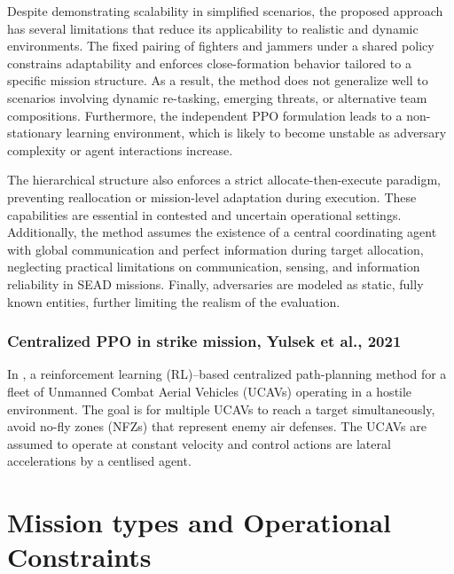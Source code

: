 Despite demonstrating scalability in simplified scenarios, the proposed approach has several limitations that reduce its applicability to realistic and dynamic environments. The fixed pairing of fighters and jammers under a shared policy constrains adaptability and enforces close-formation behavior tailored to a specific mission structure. As a result, the method does not generalize well to scenarios involving dynamic re-tasking, emerging threats, or alternative team compositions. Furthermore, the independent PPO formulation leads to a non-stationary learning environment, which is likely to become unstable as adversary complexity or agent interactions increase.

The hierarchical structure also enforces a strict allocate-then-execute paradigm, preventing reallocation or mission-level adaptation during execution. These capabilities are essential in contested and uncertain operational settings. Additionally, the method assumes the existence of a central coordinating agent with global communication and perfect information during target allocation, neglecting practical limitations on communication, sensing, and information reliability in SEAD missions. Finally, adversaries are modeled as static, fully known entities, further limiting the realism of the evaluation.

\subsubsection{Centralized PPO in strike mission, Yulsek et al., 2021}
In \cite{yuksek2021cooperative}, a reinforcement learning (RL)–based centralized path-planning method for a fleet of Unmanned Combat Aerial Vehicles (UCAVs) operating in a hostile environment. The goal is for multiple UCAVs to reach a target simultaneously, avoid no-fly zones (NFZs) that represent enemy air defenses. The UCAVs are assumed to operate at constant velocity and control actions are lateral accelerations by a centlised agent. 



\section{Mission types and Operational Constraints}


